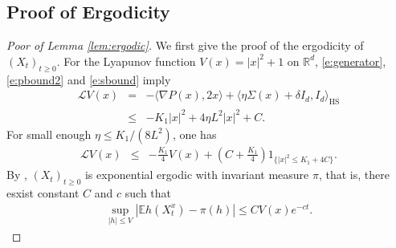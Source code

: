 \documentclass[12pt]{amsart}
\theoremstyle{definition}
\theoremstyle{remark}
\numberwithin{equation}{section}
\newcommand{\E}{\mathbb{E}}            %
\newcommand{\Ll}{\langle}
\newcommand{\Rr}{\rangle}
\newcommand{\R}{\mathbb{R}}\newcommand{\RR}{\mathbb{R}}
\begin{document}
\begin{appendix}
\section{Proof of Ergodicity}\label{appen:ergodic}
\begin{proof}[Poor of Lemma  \ref{lem:ergodic}]
	We first give the proof of the ergodicity of $(X_t)_{t\ge0}$.  For the Lyapunov function $V(x)=|x|^2+1$ on $\R^d$, \eqref{e:generator}, \eqref{e:pbound2} and \eqref{e:sbound} imply
	\begin{eqnarray*}
		\mathcal L V(x)&=&-\Ll \nabla P(x), 2x\Rr+\Ll \eta\Sigma(x)+\delta I_d, I_d  \Rr_{\textrm {HS}}\\
		&\le& -K_1|x|^2+4\eta L^2|x|^2+C.
	\end{eqnarray*}
	For small enough $\eta\le K_1/(8L^2)$, one has
	\begin{eqnarray*}
		\mathcal L V(x) &\le& -\frac {K_1}4V(x) +(C+\frac {K_1}4)1_{\{|x|^2\le K_1+4C\}}.
	\end{eqnarray*}
	By \cite[Theorem 6.1]{MeTw93}, $(X_t)_{t\ge0}$  is exponential ergodic with invariant measure $\pi$, that is, there esxist constant $C$ and $c$ such that
	\begin{eqnarray}\label{e:ergod1}
		\sup_{|h|\le V}|\E h(X_t^x)-\pi(h)|\le CV(x)e^{-ct}.
	\end{eqnarray}
	

\end{proof}
\end{appendix}
\end{document}
